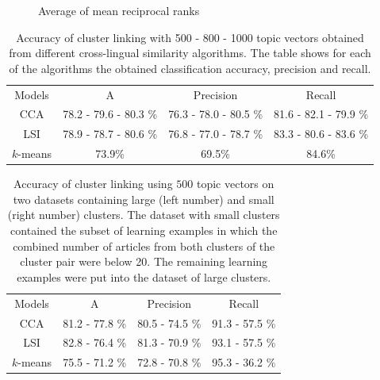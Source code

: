 \documentclass[twoside,11pt]{article}
\begin{document}
\begin{figure}
\centering

\caption{Average of mean reciprocal ranks}
\label{pic:AMRR}
\end{figure}
\begin{table}[h]
\caption{Accuracy of cluster linking with 500 - 800 - 1000 topic vectors obtained from different cross-lingual similarity algorithms. The table shows for each of the algorithms the obtained classification accuracy, precision and recall.}
\label{table:linkingEvalAlgos}
\begin{center}
\begin{tabular}{|c|c|c|c|}
  \hline
  \cline{1-4}
  Models & A & Precision & Recall \\ \cline{1-4}
  CCA      & 78.2 - 79.6 - 80.3 \% & 76.3 - 78.0 - 80.5 \%  & 81.6 - 82.1 - 79.9 \%  \\ \cline{1-4}
  LSI      & 78.9 - 78.7 - 80.6 \%  & 76.8 - 77.0 - 78.7 \%  & 83.3 - 80.6 - 83.6 \%  \\ \cline{1-4}
 $k$-means & 73.9\phantom{ - 78.7 - 80.6 }\% & 69.5\phantom{ - 78.7 - 80.6 }\%  & 84.6\phantom{ - 78.7 - 80.6 }\%  \\ \cline{1-4}
\end{tabular}
\end{center}
\end{table}

\begin{table}[h]
\caption{Accuracy of cluster linking using $500$ topic vectors on two datasets containing large (left number) and small (right number) clusters. The dataset with small clusters contained the subset of learning examples in which the combined number of articles from both clusters of the cluster pair were below 20. The remaining learning examples were put into the dataset of large clusters.}
\label{table:linkingEvalAlgosLargeSmall}
\begin{center}
\begin{tabular}{|c|c|c|c|}
  \hline
  \cline{1-4}
  Models & A & Precision & Recall \\ \cline{1-4}
  CCA      & 81.2 - 77.8 \% & 80.5 - 74.5 \%  & 91.3 - 57.5 \%  \\ \cline{1-4}
  LSI      & 82.8 - 76.4 \% & 81.3 - 70.9 \%  & 93.1 - 57.5 \%  \\ \cline{1-4}
 $k$-means & 75.5 - 71.2 \% & 72.8 - 70.8 \%  & 95.3 - 36.2 \%  \\ \cline{1-4}
\end{tabular}
\end{center}
\end{table}
\end{document}
